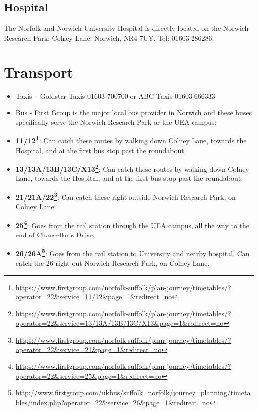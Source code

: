 \documentclass[12pt,]{book}
\providecommand{\tightlist}{%
  \setlength{\itemsep}{0pt}\setlength{\parskip}{0pt}}
\let\rmarkdownfootnote\footnote%
\def\footnote{\protect\rmarkdownfootnote}
\renewcommand{\href}[2]{#2\footnote{\url{#1}}}
\begin{document}
\subsection*{Hospital}\label{hospital}

The Norfolk and Norwich University Hospital is directly located on the
Norwich Research Park: Colney Lane, Norwich, NR4 7UY. Tel: 01603 286286.

\section*{Transport}\label{transport}

\begin{itemize}
\tightlist
\item
  Taxis -- Goldstar Taxis 01603 700700 or ABC Taxis 01603 666333
\item
  Bus - First Group is the major local bus provider in Norwich and these
  buses specifically serve the Norwich Research Park or the UEA campus:
\item
  \textbf{\href{https://www.firstgroup.com/norfolk-suffolk/plan-journey/timetables/?operator=22\&service=11/12\&page=1\&redirect=no}{11/12}}:
  Can catch these routes by walking down Colney Lane, towards the
  Hospital, and at the first bus stop past the roundabout.
\item
  \textbf{\href{https://www.firstgroup.com/norfolk-suffolk/plan-journey/timetables/?operator=22\&service=13/13A/13B/13C/X13\&page=1\&redirect=no}{13/13A/13B/13C/X13}}:
  Can catch these routes by walking down Colney Lane, towards the
  Hospital, and at the first bus stop past the roundabout.
\item
  \textbf{\href{https://www.firstgroup.com/norfolk-suffolk/plan-journey/timetables/?operator=22\&service=21\&page=1\&redirect=no}{21/21A/22}}:
  Can catch these right outside Norwich Research Park, on Colney Lane.
\item
  \textbf{\href{https://www.firstgroup.com/norfolk-suffolk/plan-journey/timetables/?operator=22\&service=25\&page=1\&redirect=no}{25}}:
  Goes from the rail station through the UEA campus, all the way to the
  end of Chancellor's Drive.
\item
  \textbf{\href{http://www.firstgroup.com/ukbus/suffolk_norfolk/journey_planning/timetables/index.php?operator=22\&service=26\&page=1\&redirect=no}{26/26A}}:
  Goes from the rail station to University and nearby hospital. Can
  catch the 26 right out Norwich Research Park, on Colney Lane.
\end{itemize}
\end{document}
